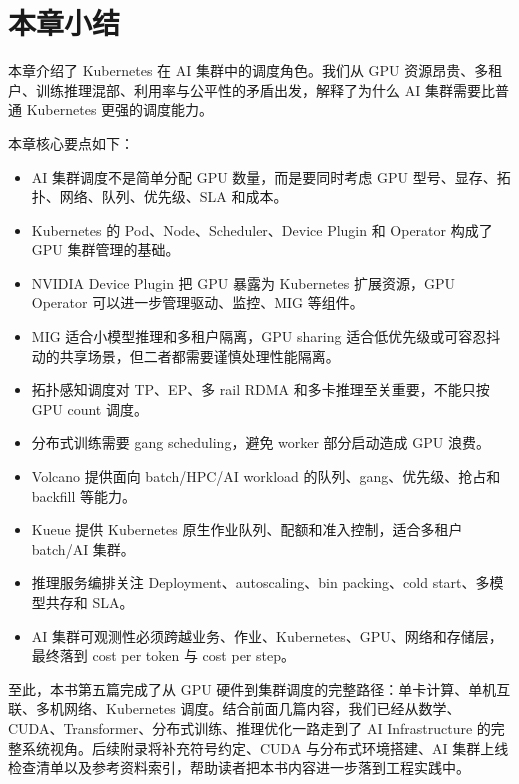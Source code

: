 \section{本章小结}
\label{sec:k8s-ai-scheduling-summary}

本章介绍了 Kubernetes 在 AI 集群中的调度角色。我们从 GPU 资源昂贵、多租户、训练推理混部、利用率与公平性的矛盾出发，解释了为什么 AI 集群需要比普通 Kubernetes 更强的调度能力。

本章核心要点如下：

\begin{itemize}
  \item AI 集群调度不是简单分配 GPU 数量，而是要同时考虑 GPU 型号、显存、拓扑、网络、队列、优先级、SLA 和成本。
  \item Kubernetes 的 Pod、Node、Scheduler、Device Plugin 和 Operator 构成了 GPU 集群管理的基础。
  \item NVIDIA Device Plugin 把 GPU 暴露为 Kubernetes 扩展资源，GPU Operator 可以进一步管理驱动、监控、MIG 等组件。
  \item MIG 适合小模型推理和多租户隔离，GPU sharing 适合低优先级或可容忍抖动的共享场景，但二者都需要谨慎处理性能隔离。
  \item 拓扑感知调度对 TP、EP、多 rail RDMA 和多卡推理至关重要，不能只按 GPU count 调度。
  \item 分布式训练需要 gang scheduling，避免 worker 部分启动造成 GPU 浪费。
  \item Volcano 提供面向 batch/HPC/AI workload 的队列、gang、优先级、抢占和 backfill 等能力。
  \item Kueue 提供 Kubernetes 原生作业队列、配额和准入控制，适合多租户 batch/AI 集群。
  \item 推理服务编排关注 Deployment、autoscaling、bin packing、cold start、多模型共存和 SLA。
  \item AI 集群可观测性必须跨越业务、作业、Kubernetes、GPU、网络和存储层，最终落到 cost per token 与 cost per step。
\end{itemize}

至此，本书第五篇完成了从 GPU 硬件到集群调度的完整路径：单卡计算、单机互联、多机网络、Kubernetes 调度。结合前面几篇内容，我们已经从数学、CUDA、Transformer、分布式训练、推理优化一路走到了 AI Infrastructure 的完整系统视角。后续附录将补充符号约定、CUDA 与分布式环境搭建、AI 集群上线检查清单以及参考资料索引，帮助读者把本书内容进一步落到工程实践中。
